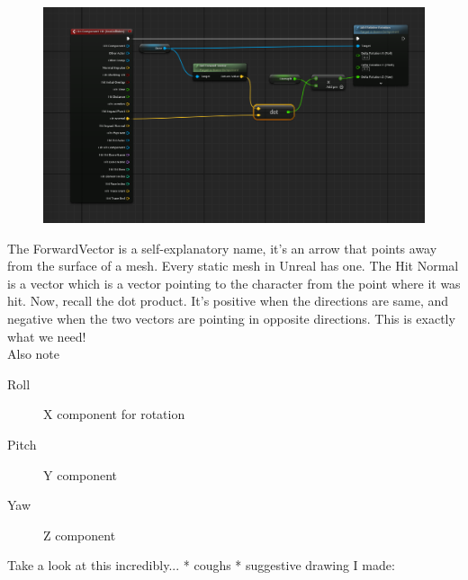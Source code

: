 \documentclass[]{article}
\begin{document}
	\begin{figure}[h]
		\centering
		\includegraphics[width=1\linewidth]{week2part2/screenshot011}
		\label{fig:screenshot011}
	\end{figure}
	
	The ForwardVector is a self-explanatory name, it's an arrow that points away from the surface of a mesh. Every static mesh in Unreal has one. The Hit Normal is a vector which is a vector pointing to the character from the point where it was hit. Now, recall the dot product. It's positive when the directions are same, and negative when the two vectors are pointing in opposite directions. This is exactly what we need! 
	\\[10pt]
	Also note
	\begin{description}
		\item[Roll] X component for rotation
		\item[Pitch] Y component
		\item[Yaw] Z component
	\end{description}
	\newpage
	Take a look at this incredibly... * coughs * suggestive drawing I made:
	
\end{document}
